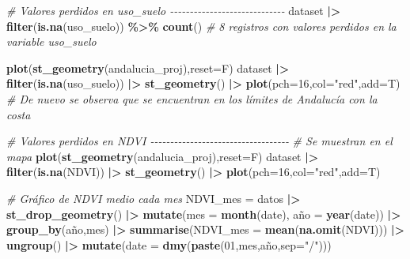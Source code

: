 \documentclass[12pt,a4paper,]{book}
\newenvironment{Shaded}{\begin{snugshade}}{\end{snugshade}}
\newcommand{\AttributeTok}[1]{\textcolor[rgb]{0.13,0.29,0.53}{#1}}
\newcommand{\CommentTok}[1]{\textcolor[rgb]{0.56,0.35,0.01}{\textit{#1}}}
\newcommand{\DecValTok}[1]{\textcolor[rgb]{0.00,0.00,0.81}{#1}}
\newcommand{\FunctionTok}[1]{\textcolor[rgb]{0.13,0.29,0.53}{\textbf{#1}}}
\newcommand{\NormalTok}[1]{#1}
\newcommand{\OtherTok}[1]{\textcolor[rgb]{0.56,0.35,0.01}{#1}}
\newcommand{\SpecialCharTok}[1]{\textcolor[rgb]{0.81,0.36,0.00}{\textbf{#1}}}
\newcommand{\StringTok}[1]{\textcolor[rgb]{0.31,0.60,0.02}{#1}}
\numberwithin{dummy}{section}
\theoremstyle{ocrenumbox}
\theoremstyle{blacknumex}
\theoremstyle{blacknumbox}
\theoremstyle{ocrenum}
\theoremstyle{ocrenum}
\begin{document}
\begin{Shaded}
\begin{Highlighting}[]
\CommentTok{\# Valores perdidos en uso\_suelo {-}{-}{-}{-}{-}{-}{-}{-}{-}{-}{-}{-}{-}{-}{-}{-}{-}{-}{-}{-}{-}{-}{-}{-}{-}{-}{-}{-}{-}}
\NormalTok{dataset }\SpecialCharTok{|\textgreater{}} \FunctionTok{filter}\NormalTok{(}\FunctionTok{is.na}\NormalTok{(uso\_suelo)) }\SpecialCharTok{\%\textgreater{}\%} \FunctionTok{count}\NormalTok{() }\CommentTok{\# 8 registros con valores perdidos en la variable uso\_suelo}

\FunctionTok{plot}\NormalTok{(}\FunctionTok{st\_geometry}\NormalTok{(andalucia\_proj),}\AttributeTok{reset=}\NormalTok{F)}
\NormalTok{dataset }\SpecialCharTok{|\textgreater{}} \FunctionTok{filter}\NormalTok{(}\FunctionTok{is.na}\NormalTok{(uso\_suelo)) }\SpecialCharTok{|\textgreater{}} \FunctionTok{st\_geometry}\NormalTok{() }\SpecialCharTok{|\textgreater{}} \FunctionTok{plot}\NormalTok{(}\AttributeTok{pch=}\DecValTok{16}\NormalTok{,}\AttributeTok{col=}\StringTok{"red"}\NormalTok{,}\AttributeTok{add=}\NormalTok{T)}
\CommentTok{\# De nuevo se observa que se encuentran en los límites de Andalucía con la costa}

\CommentTok{\# Valores perdidos en NDVI {-}{-}{-}{-}{-}{-}{-}{-}{-}{-}{-}{-}{-}{-}{-}{-}{-}{-}{-}{-}{-}{-}{-}{-}{-}{-}{-}{-}{-}{-}{-}{-}{-}{-}{-}}
\CommentTok{\# Se muestran en el mapa}
\FunctionTok{plot}\NormalTok{(}\FunctionTok{st\_geometry}\NormalTok{(andalucia\_proj),}\AttributeTok{reset=}\NormalTok{F)}
\NormalTok{dataset }\SpecialCharTok{|\textgreater{}} \FunctionTok{filter}\NormalTok{(}\FunctionTok{is.na}\NormalTok{(NDVI)) }\SpecialCharTok{|\textgreater{}} \FunctionTok{st\_geometry}\NormalTok{() }\SpecialCharTok{|\textgreater{}} \FunctionTok{plot}\NormalTok{(}\AttributeTok{pch=}\DecValTok{16}\NormalTok{,}\AttributeTok{col=}\StringTok{"red"}\NormalTok{,}\AttributeTok{add=}\NormalTok{T) }


\CommentTok{\# Gráfico de NDVI medio cada mes}
\NormalTok{NDVI\_mes }\OtherTok{=}\NormalTok{ datos }\SpecialCharTok{|\textgreater{}} 
  \FunctionTok{st\_drop\_geometry}\NormalTok{() }\SpecialCharTok{|\textgreater{}} 
  \FunctionTok{mutate}\NormalTok{(}\AttributeTok{mes =} \FunctionTok{month}\NormalTok{(date),}
\NormalTok{         año }\OtherTok{=} \FunctionTok{year}\NormalTok{(date)) }\SpecialCharTok{|\textgreater{}} 
  \FunctionTok{group\_by}\NormalTok{(año,mes) }\SpecialCharTok{|\textgreater{}} 
  \FunctionTok{summarise}\NormalTok{(}\AttributeTok{NDVI\_mes =} \FunctionTok{mean}\NormalTok{(}\FunctionTok{na.omit}\NormalTok{(NDVI))) }\SpecialCharTok{|\textgreater{}} 
  \FunctionTok{ungroup}\NormalTok{() }\SpecialCharTok{|\textgreater{}} 
  \FunctionTok{mutate}\NormalTok{(}\AttributeTok{date =} \FunctionTok{dmy}\NormalTok{(}\FunctionTok{paste}\NormalTok{(}\DecValTok{01}\NormalTok{,mes,año,}\AttributeTok{sep=}\StringTok{"/"}\NormalTok{)))}
  

\end{Highlighting}
\end{Shaded}
\end{document}

